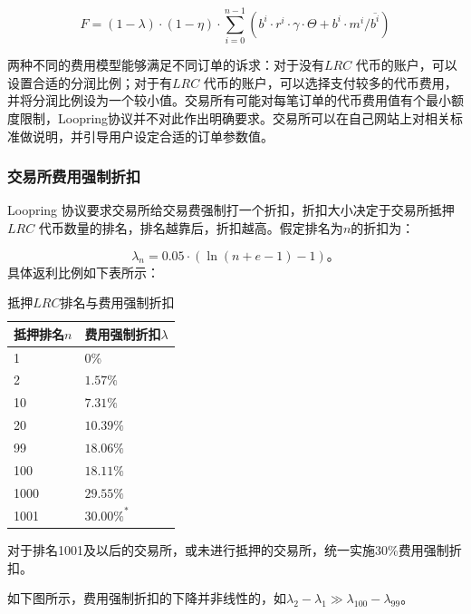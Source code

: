 \documentclass[UTF8,nofonts]{ctexart}
\begin{document}
\begin{equation*}
F =(1-\lambda)\cdot (1-\eta) \cdot  \sum^{n-1}_{i=0} (b^i \cdot r^i \cdot \gamma \cdot \Theta + b^i \cdot m^i  / \overline{b^i})
\end{equation*}


两种不同的费用模型能够满足不同订单的诉求：对于没有$LRC$ 代币的账户，可以设置合适的分润比例；对于有$LRC$ 代币的账户，可以选择支付较多的代币费用，并将分润比例设为一个较小值。交易所有可能对每笔订单的代币费用值有个最小额度限制，Loopring协议并不对此作出明确要求。交易所可以在自己网站上对相关标准做说明，并引导用户设定合适的订单参数值。

\subsubsection{交易所费用强制折扣}
Loopring 协议要求交易所给交易费强制打一个折扣，折扣大小决定于交易所抵押$LRC$ 代币数量的排名，排名越靠后，折扣越高。假定排名为$n$的折扣为：

$$\lambda_{n} = 0.05\cdot(\ln (n+e-1) - 1)\text{。}$$
具体返利比例如下表所示：


\begin{table}[hbt]
  \centering
\begin{tabular}{p{3.5cm}|p{3cm}} %
抵押排名$n$ & 费用强制折扣$\lambda$ \\ %
    \hline
1 & 0\%\\
\hline
2 & $1.57\%$\\
\hline
10 & $7.31\%$\\
\hline
20 & $10.39\%$\\
\hline
99 &$18.06\%$\\
\hline
100 &$18.11\%$\\
\hline
1000 &$29.55\%$\\
\hline
1001 &$30.00\%^*$\\
  \end{tabular}
\caption{抵押$LRC$排名与费用强制折扣} %
\end{table}


对于排名1001及以后的交易所，或未进行抵押的交易所，统一实施30\%费用强制折扣。

如下图所示，费用强制折扣的下降并非线性的，如$\lambda_{2} - \lambda_{1} \gg \lambda_{100} - \lambda_{99}$。
\end{document}
